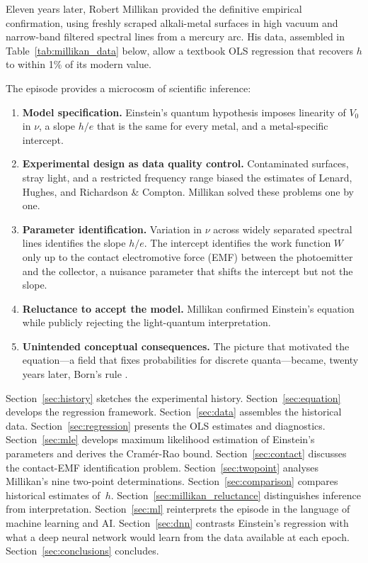 \documentclass[12pt]{article}
\begin{document}
Eleven years later, Robert Millikan \citep{Millikan1916} provided the
definitive empirical confirmation, using freshly scraped alkali-metal surfaces
in high vacuum and narrow-band filtered spectral lines from a mercury arc.
His data, assembled in Table~\ref{tab:millikan_data} below, allow a textbook
OLS regression that recovers $h$ to within 1\% of its modern value.

The episode provides a microcosm of scientific inference:
\begin{enumerate}
  \item \textbf{Model specification.}  Einstein's quantum hypothesis imposes
    linearity of $V_0$ in $\nu$, a slope $h/e$ that is the same for every
    metal, and a metal-specific intercept.
  \item \textbf{Experimental design as data quality control.}  Contaminated
    surfaces, stray light, and a restricted frequency range biased the
    estimates of Lenard, Hughes, and Richardson \& Compton.  Millikan solved
    these problems one by one.
  \item \textbf{Parameter identification.}  Variation in $\nu$ across widely
    separated spectral lines identifies the slope $h/e$.  The intercept
    identifies the work function $W$ only up to the contact electromotive
    force (EMF) between the photoemitter and the collector, a nuisance
    parameter that shifts the intercept but not the slope.
  \item \textbf{Reluctance to accept the model.}  Millikan confirmed
    Einstein's equation while publicly rejecting the light-quantum
    interpretation.
  \item \textbf{Unintended conceptual consequences.}  The picture that
    motivated the equation---a field that fixes probabilities for discrete
    quanta---became, twenty years later, Born's rule \citep{Born1926}.
\end{enumerate}

Section~\ref{sec:history} sketches the experimental history.
Section~\ref{sec:equation} develops the regression framework.
Section~\ref{sec:data} assembles the historical data.
Section~\ref{sec:regression} presents the OLS estimates and diagnostics.
Section~\ref{sec:mle} develops maximum likelihood estimation of Einstein's
parameters and derives the Cram\'er-Rao bound.
Section~\ref{sec:contact} discusses the contact-EMF identification problem.
Section~\ref{sec:twopoint} analyses Millikan's nine two-point determinations.
Section~\ref{sec:comparison} compares historical estimates of~$h$.
Section~\ref{sec:millikan_reluctance} distinguishes inference from
interpretation.
Section~\ref{sec:ml} reinterprets the episode in the language of machine
learning and AI.
Section~\ref{sec:dnn} contrasts Einstein's regression with what a deep
neural network would learn from the data available at each epoch.
Section~\ref{sec:conclusions} concludes.
\end{document}
